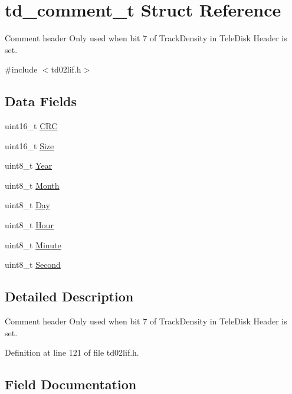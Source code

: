 \hypertarget{structtd__comment__t}{}\section{td\+\_\+comment\+\_\+t Struct Reference}
\label{structtd__comment__t}


Comment header Only used when bit 7 of Track\+Density in Tele\+Disk Header is set.  




{\ttfamily \#include $<$td02lif.\+h$>$}

\subsection*{Data Fields}
\begin{DoxyCompactItemize}
\item 
uint16\+\_\+t \hyperlink{structtd__comment__t_a4bcc6435d5a4408627be9f50ef124211}{C\+RC}
\item 
uint16\+\_\+t \hyperlink{structtd__comment__t_aca61f38ae62a6de2ff0eab7da2c25e11}{Size}
\item 
uint8\+\_\+t \hyperlink{structtd__comment__t_a0c804ec07303f411dd508dc64900aff5}{Year}
\item 
uint8\+\_\+t \hyperlink{structtd__comment__t_ac926fbfad0e3544bb45bb05b7cd66c49}{Month}
\item 
uint8\+\_\+t \hyperlink{structtd__comment__t_ab42475ed36aa4475f76336099fd53acc}{Day}
\item 
uint8\+\_\+t \hyperlink{structtd__comment__t_ae42f4895a24dadba8528e32d89d601c6}{Hour}
\item 
uint8\+\_\+t \hyperlink{structtd__comment__t_a40d01b0af51b4896e0d771e8a458ed87}{Minute}
\item 
uint8\+\_\+t \hyperlink{structtd__comment__t_ae89673be13e6cad1c83bd51034689248}{Second}
\end{DoxyCompactItemize}


\subsection{Detailed Description}
Comment header Only used when bit 7 of Track\+Density in Tele\+Disk Header is set. 

Definition at line 121 of file td02lif.\+h.



\subsection{Field Documentation}
\mbox{\label{structtd__comment__t_a4bcc6435d5a4408627be9f50ef124211}} 
